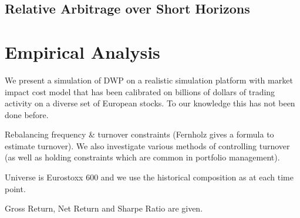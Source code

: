 \documentclass[british]{amsart} \usepackage{lmodern}
\numberwithin{equation}{section} \numberwithin{figure}{section}
\theoremstyle{plain} \newtheorem{thm}{\protect\theoremname}[section]
\theoremstyle{definition} \newtheorem{defn}[thm]{\protect\definitionname}
\theoremstyle{plain} \newtheorem{assumption}[thm]{\protect\assumptionname}
\theoremstyle{plain} \newtheorem{lem}[thm]{\protect\lemmaname}
\theoremstyle{plain} \newtheorem{prop}[thm]{\protect\propositionname}
\theoremstyle{remark} \newtheorem{rem}[thm]{\protect\remarkname}
\theoremstyle{plain} \newtheorem{cor}[thm]{\protect\corollaryname}
\begin{document}
\subsection{Relative Arbitrage over Short Horizons}

\newpage
\section{Empirical Analysis}

We present a simulation of DWP  on a realistic simulation platform
with market impact cost model that has been calibrated on billions
of dollars of trading activity on a diverse set of European stocks.
To our knowledge this has not been done before. 

Rebalancing frequency \& turnover constraints (Fernholz gives a formula
to estimate turnover). We also investigate various methods of controlling
turnover (as well as holding constraints which are common in portfolio
management).

Universe is Eurostoxx 600 and we use the historical composition as
at each time point.

Gross Return, Net Return and Sharpe Ratio are given.


\newpage
\printbibliography
\end{document}
